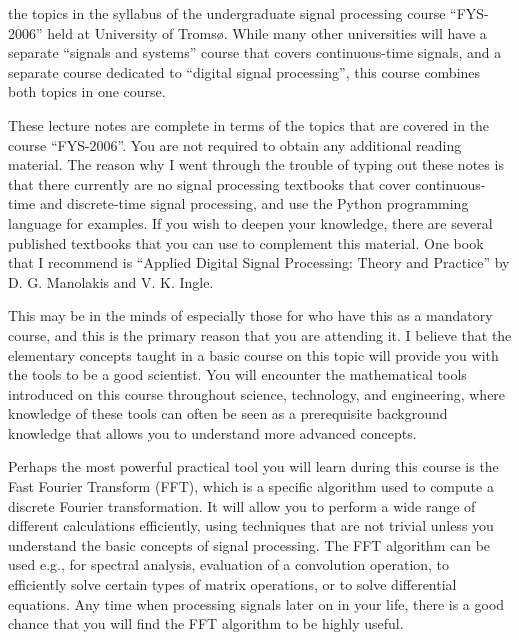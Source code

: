  the topics in the syllabus of the
undergraduate signal processing course ``FYS-2006'' held at University
of Troms\o{}. While many other universities will have a separate
``signals and systems'' course that covers continuous-time signals,
and a separate course dedicated to ``digital signal processing'', this
course combines both topics in one course.

These lecture notes are complete in terms of the topics that are
covered in the course ``FYS-2006''. You are not required to obtain any
additional reading material. The reason why I went through the trouble
of typing out these notes is that there currently are no signal
processing textbooks that cover continuous-time and discrete-time
signal processing, and use the Python programming language for
examples. If you wish to deepen your knowledge, there are several
published textbooks that you can use to complement this material. One
book that I recommend is ``Applied Digital Signal Processing: Theory
and Practice'' by D. G. Manolakis and V. K. Ingle.




 This may be in the minds of especially those
for who have this as a mandatory course, and this is the primary
reason that you are attending it. I believe that the elementary
concepts taught in a basic course on this topic will provide you with
the tools to be a good scientist. You will encounter the mathematical
tools introduced on this course throughout science, technology, and
engineering, where knowledge of these tools can often be seen as a
prerequisite background knowledge that allows you to understand more
advanced concepts.

Perhaps the most powerful practical tool you will learn during this
course is the Fast Fourier Transform (FFT), which is a specific
algorithm used to compute a discrete Fourier transformation. It will
allow you to perform a wide range of different calculations
efficiently, using techniques that are not trivial unless you
understand the basic concepts of signal processing. The FFT algorithm
can be used e.g., for spectral analysis, evaluation of a convolution
operation, to efficiently solve certain types of matrix operations, or
to solve differential equations. Any time when processing signals
later on in your life, there is a good chance that you will find the
FFT algorithm to be highly useful.

